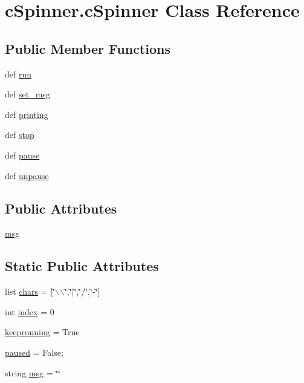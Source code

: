 \hypertarget{classcSpinner_1_1cSpinner}{\section{c\-Spinner.\-c\-Spinner \-Class \-Reference}
\label{classcSpinner_1_1cSpinner}
}
\subsection*{\-Public \-Member \-Functions}
\begin{DoxyCompactItemize}
\item 
def \hyperlink{classcSpinner_1_1cSpinner_abc727891482c78f4a1df8b4d26675f43}{run}
\item 
def \hyperlink{classcSpinner_1_1cSpinner_a96e91b915c76fa4eb1068ff10a048678}{set\-\_\-msg}
\item 
def \hyperlink{classcSpinner_1_1cSpinner_acc1ea1e24f29cb9ff1acb6ec1377c8e7}{printing}
\item 
def \hyperlink{classcSpinner_1_1cSpinner_a15dca75e0f064e56b6259858cba89ecd}{stop}
\item 
def \hyperlink{classcSpinner_1_1cSpinner_a1ba68a7036630cb9d5b963b7bb7f71f9}{pause}
\item 
def \hyperlink{classcSpinner_1_1cSpinner_ae842f488ea435f06a49b19a8a8f91793}{unpause}
\end{DoxyCompactItemize}
\subsection*{\-Public \-Attributes}
\begin{DoxyCompactItemize}
\item 
\hyperlink{classcSpinner_1_1cSpinner_a58b879cfb514915a371d25fbf031210b}{msg}
\end{DoxyCompactItemize}
\subsection*{\-Static \-Public \-Attributes}
\begin{DoxyCompactItemize}
\item 
list \hyperlink{classcSpinner_1_1cSpinner_af7a831a9f8d77e2256df7c5b0cf13ae7}{chars} = \mbox{[}\char`\"{}$\backslash$$\backslash$\char`\"{},\char`\"{}$|$\char`\"{},\char`\"{}/\char`\"{},\char`\"{}-\/\char`\"{}\mbox{]}
\item 
int \hyperlink{classcSpinner_1_1cSpinner_a135147a4bc551216e6ab661adaa68df3}{index} = 0
\item 
\hyperlink{classcSpinner_1_1cSpinner_a8804996158a1e7e26c5947a927b5bee7}{keeprunning} = \-True
\item 
\hyperlink{classcSpinner_1_1cSpinner_ab34ce9a9b313f2fda4225e81fd1c8f56}{paused} = \-False;
\item 
string \hyperlink{classcSpinner_1_1cSpinner_a453929c31466debd4a3b5848b16e3082}{msg} = \char`\"{}\char`\"{}
\end{DoxyCompactItemize}


